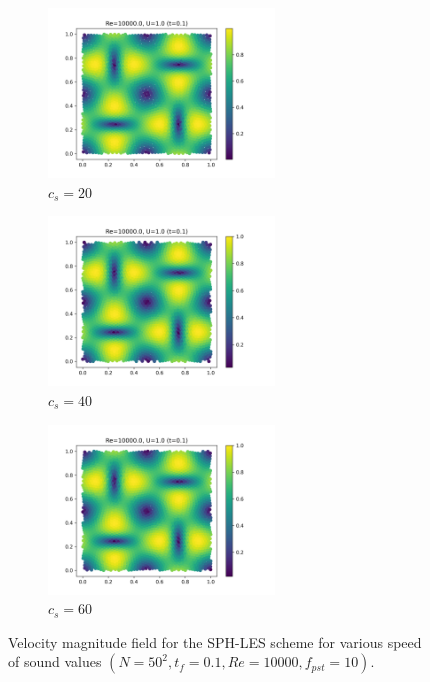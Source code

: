 \begin{figure}[H]
  \begin{subfigure}{7cm}
    \centering\includegraphics[width=6cm]{Code-Figures/okra2022/c0/c0_20_tait_pec_dtmul_1_nx_50_pst_10_re_10000_ok2022/final_vmag.png}
    \caption{$c_s=20$}
  \end{subfigure}
  \begin{subfigure}{7cm}
    \centering\includegraphics[width=6cm]{Code-Figures/okra2022/c0/c0_40_tait_pec_dtmul_1_nx_50_pst_10_re_10000_ok2022/final_vmag.png}
    \caption{$c_s=40$}
  \end{subfigure}
  \begin{subfigure}{7cm}
    \centering\includegraphics[width=6cm]{Code-Figures/okra2022/c0/c0_60_tait_pec_dtmul_1_nx_50_pst_10_re_10000_ok2022/final_vmag.png}
    \caption{$c_s=60$}
  \end{subfigure}
  \caption{Velocity magnitude field for the SPH-LES scheme for various speed of sound values $(N=50^2, t_f=0.1, Re=10000, f_{pst}=10)$.}
  \label{fig:okra2022-c0-vmag}
\end{figure}

